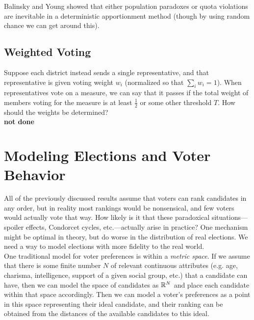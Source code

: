\documentclass{amsart}
\begin{document}
Balinsky and Young showed that either population paradoxes or quota violations are inevitable in a deterministic apportionment method (though by using random chance we can get around this).\\

\subsection{Weighted Voting} Suppose each district instead sends a single representative, and that representative is given voting weight $w_i$ (normalized so that $\sum_i w_i=1$). When representatives vote on a measure, we can say that it passes if the total weight of members voting for the measure is at least $\tfrac12$ or some other threshold $T$. How should the weights be determined?\\

\textbf{not done}

\newpage 

\section{Modeling Elections and Voter Behavior}

All of the previously discussed results assume that voters can rank candidates in any order, but in reality most rankings would be nonsensical, and few voters would actually vote that way. How likely is it that these paradoxical situations---spoiler effects, Condorcet cycles, etc.---actually arise in practice? One mechanism might be optimal in theory, but do worse in the distribution of real elections. We need a way to model elections with more fidelity to the real world.\\

One traditional model for voter preferences is within a \textit{metric space}. If we assume that there is some finite number $N$ of relevant continuous attributes (e.g. age, charisma, intelligence, support of a given social group, etc.) that a candidate can have, then we can model the space of candidates as $\mathbb{R}^N$ and place each candidate within that space accordingly. Then we can model a voter's preferences as a point in this space representing their ideal candidate, and their ranking can be obtained from the distances of the available candidates to this ideal.
\end{document}

